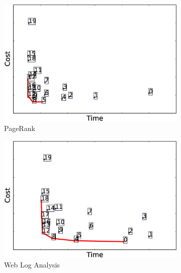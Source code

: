 \begin{figure}
    \captionsetup{justification=centering}
    \centering
    \begin{subfigure}[b]{0.3\textwidth}
        \includegraphics[width=\textwidth]{Chapter-CAT/figures/pagerank_elapsed_cost_all_frontier.eps}
        \caption{PageRank}
        \label{fig:pagerank_configurations}
    \end{subfigure}
    \begin{subfigure}[b]{0.3\textwidth}
        \includegraphics[width=\textwidth]{Chapter-CAT/figures/webloganalysis_elapsed_cost_all_frontier.eps}
        \caption{Web Log Analysis}
        \label{fig:webloganalysis_configurations}
    \end{subfigure}
    \begin{subfigure}[b]{0.3\textwidth}

\end{subfigure}
\end{figure}
